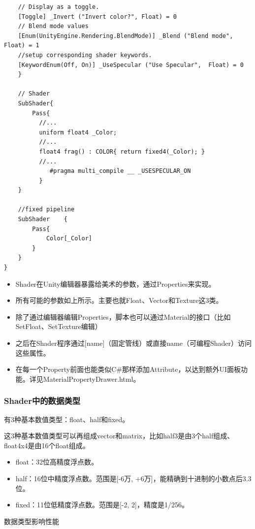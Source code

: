 \documentclass[9pt, b5paper]{article}
\begin{document}
\begin{enumerate}
\begin{verbatim}
    // Display as a toggle.
    [Toggle] _Invert ("Invert color?", Float) = 0
    // Blend mode values
    [Enum(UnityEngine.Rendering.BlendMode)] _Blend ("Blend mode", Float) = 1
    //setup corresponding shader keywords.
    [KeywordEnum(Off, On)] _UseSpecular ("Use Specular",  Float) = 0
    }

    // Shader
    SubShader{
        Pass{
          //...
          uniform float4 _Color;
          //...
          float4 frag() : COLOR{ return fixed4(_Color); }
          //...
             #pragma multi_compile __ _USESPECULAR_ON
          }
    }

    //fixed pipeline
    SubShader    {
        Pass{
            Color[_Color]
        }
    }
}
\end{verbatim}

\begin{itemize}
\item Shader在Unity编辑器暴露给美术的参数，通过Properties来实现。
\item 所有可能的参数如上所示。主要也就Float、Vector和Texture这3类。
\item 除了通过编辑器编辑Properties，脚本也可以通过Material的接口（比如SetFloat、SetTexture编辑）
\item 之后在Shader程序通过[name]（固定管线）或直接name（可编程Shader）访问这些属性。
\item 在每一个Property前面也能类似C\#那样添加Attribute，以达到额外UI面板功能。详见MaterialPropertyDrawer.html。
\end{itemize}
\end{enumerate}
\subsubsection{Shader中的数据类型}
\label{sec:orgd4af8b9}

有3种基本数值类型：float、half和fixed。

这3种基本数值类型可以再组成vector和matrix，比如half3是由3个half组成、float4x4是由16个float组成。

\begin{itemize}
\item float：32位高精度浮点数。
\item half：16位中精度浮点数。范围是[-6万, +6万]，能精确到十进制的小数点后3.3位。
\item fixed：11位低精度浮点数。范围是[-2, 2]，精度是1/256。
\end{itemize}

数据类型影响性能
\end{document}
